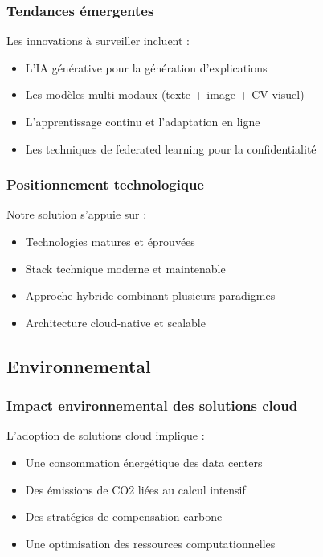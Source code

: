 \documentclass[12pt,a4paper]{report}
\begin{document}
\subsubsection{Tendances émergentes}

Les innovations à surveiller incluent :
\begin{itemize}
\item L'IA générative pour la génération d'explications
\item Les modèles multi-modaux (texte + image + CV visuel)
\item L'apprentissage continu et l'adaptation en ligne
\item Les techniques de federated learning pour la confidentialité
\end{itemize}

\subsubsection{Positionnement technologique}

Notre solution s'appuie sur :
\begin{itemize}
\item Technologies matures et éprouvées
\item Stack technique moderne et maintenable
\item Approche hybride combinant plusieurs paradigmes
\item Architecture cloud-native et scalable
\end{itemize}

\subsection{Environnemental}

\subsubsection{Impact environnemental des solutions cloud}

L'adoption de solutions cloud implique :
\begin{itemize}
\item Une consommation énergétique des data centers
\item Des émissions de CO2 liées au calcul intensif
\item Des stratégies de compensation carbone
\item Une optimisation des ressources computationnelles
\end{itemize}
\end{document}
